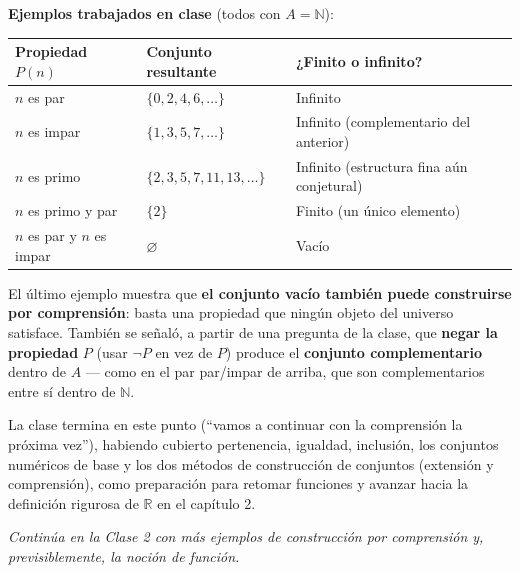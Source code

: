 \documentclass[12pt,a4paper]{article}
\begin{document}
\textbf{Ejemplos trabajados en clase} (todos con $A = \mathbb{N}$):

\begin{table}[H]
\centering
\begin{tabularx}{\textwidth}{@{}lXX@{}}
\toprule
Propiedad $P(n)$ & Conjunto resultante & ¿Finito o infinito? \\
\midrule
$n$ es par & $\{0, 2, 4, 6, \ldots\}$ & Infinito \\
$n$ es impar & $\{1, 3, 5, 7, \ldots\}$ & Infinito (complementario del anterior) \\
$n$ es primo & $\{2, 3, 5, 7, 11, 13, \ldots\}$ & Infinito (estructura fina aún conjetural) \\
$n$ es primo y par & $\{2\}$ & Finito (un único elemento) \\
$n$ es par y $n$ es impar & $\varnothing$ & Vacío \\
\bottomrule
\end{tabularx}
\end{table}

\begin{notebox}
El último ejemplo muestra que \textbf{el conjunto vacío también puede
construirse por comprensión}: basta una propiedad que ningún objeto del
universo satisface. También se señaló, a partir de una pregunta de la
clase, que \textbf{negar la propiedad} $P$ (usar $\neg P$ en vez de $P$)
produce el \textbf{conjunto complementario} dentro de $A$ --- como en el
par par/impar de arriba, que son complementarios entre sí dentro de
$\mathbb{N}$.
\end{notebox}

La clase termina en este punto (``vamos a continuar con la comprensión la
próxima vez''), habiendo cubierto pertenencia, igualdad, inclusión, los
conjuntos numéricos de base y los dos métodos de construcción de conjuntos
(extensión y comprensión), como preparación para retomar funciones y
avanzar hacia la definición rigurosa de $\mathbb{R}$ en el capítulo 2.

\emph{Continúa en la Clase 2 con más ejemplos de construcción por
comprensión y, previsiblemente, la noción de función.}
\end{document}
